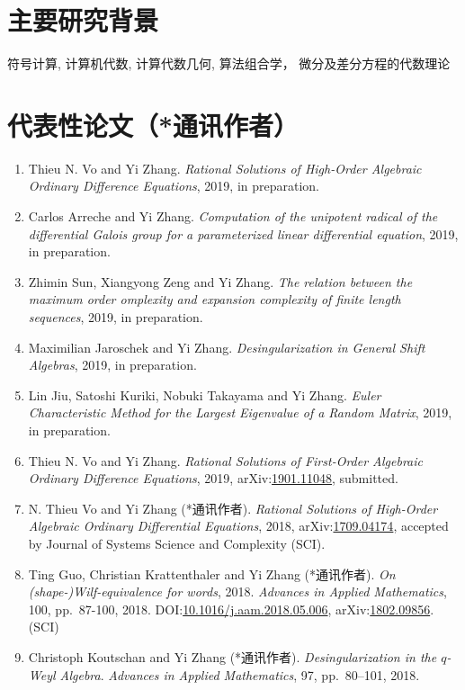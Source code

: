 \documentclass[a4paper,12pt]{article}
\begin{document}
\begin{CJK*}{UTF8}{gbsn}
\section*{\Large{主要研究背景}}
符号计算, 计算机代数, 计算代数几何, 算法组合学， 微分及差分方程的代数理论

\section*{\Large{代表性论文（*通讯作者）}}
\begin{enumerate}
\item Thieu N. Vo and Yi Zhang. 
{\em Rational Solutions of High-Order Algebraic Ordinary Difference Equations}, 2019, in preparation.
\item Carlos Arreche and Yi Zhang.
{\em Computation of the unipotent radical of the differential Galois group for a parameterized linear differential equation}, 2019, in preparation. 
\item Zhimin Sun,  Xiangyong Zeng and Yi Zhang. 
{\em The relation between the maximum order
omplexity and expansion complexity of finite length sequences}, 2019, in preparation.
\item Maximilian Jaroschek and Yi Zhang. 
{\em Desingularization in General Shift Algebras}, 2019, in preparation.
\item Lin Jiu, Satoshi Kuriki, Nobuki Takayama and Yi Zhang. 
 {\em Euler Characteristic Method for the Largest Eigenvalue of a Random Matrix}, 2019, in preparation.
  \item Thieu N. Vo and Yi Zhang. 
{\em Rational Solutions of First-Order Algebraic Ordinary Difference Equations}, 2019,  
arXiv:\href{http://arxiv.org/abs/1901.11048}{1901.11048}, submitted.
  \item N. Thieu Vo and Yi Zhang (*通讯作者). {\em Rational Solutions of High-Order Algebraic Ordinary Differential Equations}, 2018, 
  arXiv:\href{https://arxiv.org/abs/1709.04174}{1709.04174}, accepted by Journal of Systems Science and Complexity (SCI).
\item Ting Guo, Christian Krattenthaler and Yi Zhang (*通讯作者).
{\em On (shape-)Wilf-equivalence for words}, 2018.
{\em  Advances in Applied Mathematics}, 100, pp.\ 87-100, 2018. 
DOI:\href{https://doi.org/10.1016/j.aam.2018.05.006}{10.1016/j.aam.2018.05.006}, 
arXiv:\href{https://arxiv.org/pdf/1802.09856.pdf}{1802.09856}. (SCI)
\item Christoph Koutschan and Yi Zhang (*通讯作者). {\em Desingularization in the $q$-Weyl Algebra}. 
{\em Advances in Applied Mathematics}, 97, pp.\ 80–101, 2018. \\

\end{enumerate}
\end{CJK*}
\end{document}

